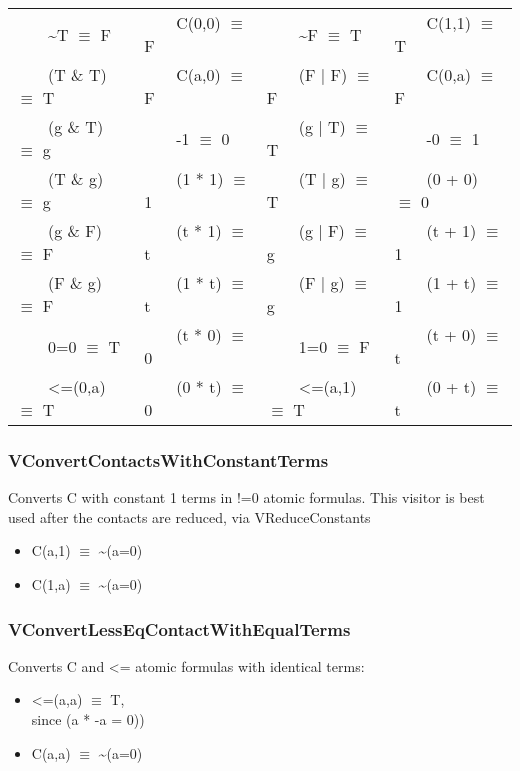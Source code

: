 \documentclass{article}
\newcommand{\tabitem}{~~\llap{\textbullet}~~}
\begin{document}
			\begin{table}[H]
				  \centering
				  \begin{tabular}{llll}
				    \toprule
				    \midrule
				\tabitem \textasciitilde T $\equiv$ F & \tabitem C(0,0)  $\equiv$ F & \tabitem \textasciitilde F $\equiv$ T & \tabitem C(1,1) $\equiv$ T \\
				\tabitem (T \& T) $\equiv$ T & \tabitem C(a,0)  $\equiv$ F & \tabitem (F | F) $\equiv$ F & \tabitem C(0,a) $\equiv$ F \\
				\tabitem (g \& T) $\equiv$ g & \tabitem -1 $\equiv$ 0 & \tabitem (g | T) $\equiv$ T & \tabitem -0 $\equiv$ 1 \\
				\tabitem (T \& g) $\equiv$ g & \tabitem (1 * 1) $\equiv$ 1 & \tabitem (T | g) $\equiv$ T & \tabitem (0 + 0) $\equiv$ 0 \\
				\tabitem (g \& F) $\equiv$ F & \tabitem (t * 1) $\equiv$ t & \tabitem (g | F) $\equiv$ g & \tabitem (t + 1) $\equiv$ 1 \\
				\tabitem (F \& g) $\equiv$ F & \tabitem (1 * t) $\equiv$ t & \tabitem (F | g) $\equiv$ g & \tabitem (1 + t) $\equiv$ 1 \\
				\tabitem 0=0 $\equiv$ T & \tabitem (t * 0) $\equiv$ 0 & \tabitem 1=0 $\equiv$ F & \tabitem (t + 0) $\equiv$ t \\
				\tabitem <=(0,a) $\equiv$ T & \tabitem (0 * t) $\equiv$ 0 & \tabitem <=(a,1) $\equiv$ T & \tabitem (0 + t) $\equiv$ t \\

					    \bottomrule
				  \end{tabular}
				\end{table}
			\subsubsection*{VConvertContactsWithConstantTerms}
				Converts C with constant 1 terms in !=0 atomic formulas. 
				This visitor is best used after the contacts are reduced, via VReduceConstants
				\begin{itemize}
					\item C(a,1) $\equiv$ \textasciitilde(a=0)  
					\item C(1,a) $\equiv$ \textasciitilde(a=0)
				\end{itemize}
			\subsubsection*{VConvertLessEqContactWithEqualTerms}
				Converts C and <= atomic formulas with identical terms:
				\begin{itemize}
					\item <=(a,a) $\equiv$ T, \\
						since (a * -a = 0))
					\item C(a,a) $\equiv$ \textasciitilde(a=0)
				\end{itemize}
\end{document}

